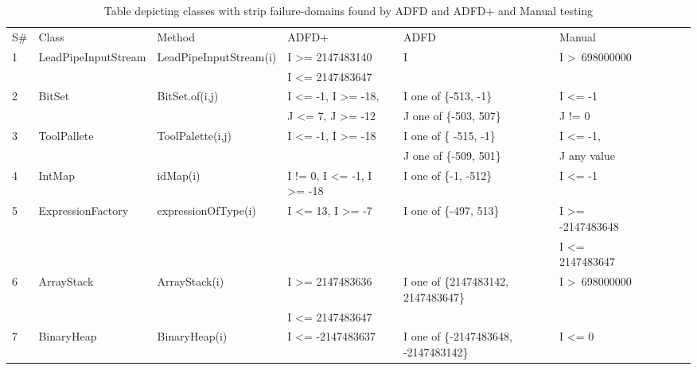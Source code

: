 \documentclass[conference]{IEEEtran}
\begin{document}
\begin{table}[h]
\caption{Table depicting classes with strip failure-domains found by ADFD and ADFD+ and Manual testing}
\centering
{\renewcommand{\arraystretch}{0.9}
\begin{tabular}{llllllllll}

S\#  & Class						& Method 					& ADFD+       								& ADFD     								& Manual							\\
1	&LeadPipeInputStream 		& LeadPipeInputStream(i)		& I \textgreater= 2147483140				& I 										& I \textgreater~698000000			\\ 
	&                                             &                                             & I \textless= 2147483647  					&										&									\\
2	& BitSet				  		& BitSet.of(i,j)				& I \textless= -1, I \textgreater= -18,			& I one of \{-513, -1\}					& I \textless= -1						\\ 
	&                                             &                                             & J \textless= 7, J \textgreater= -12  			& J one of \{-503, 507\}					& J != 0								\\
3	& ToolPallete			  		& ToolPalette(i,j)				& I \textless= -1, I \textgreater= -18			& I one of \{ -515, -1\}					& I \textless= -1, 					\\ 
	&                                             &                                             & 				  							& J one of \{-509, 501\}					& J any value			   				\\
4	& IntMap			  		& idMap(i)					& I != 0, I \textless= -1, I \textgreater= -18	& I one of \{-1, -512\} 					& I \textless= -1						\\ 
5	& ExpressionFactory	  		& expressionOfType(i)		& I \textless= 13, I \textgreater= -7			& I one of \{-497, 513\}					& I \textgreater= -2147483648 		\\ 
	&                                             & 				  			& 											&										& I \textless= 2147483647			\\
6	& ArrayStack					& ArrayStack(i)				& I \textgreater= 2147483636				& I one of \{2147483142, 2147483647\}	& I \textgreater~698000000 			\\ 
	&                                             &                                             & I \textless= 2147483647 					& 										&  			   						\\
7	& BinaryHeap				& BinaryHeap(i)				& I \textless= -2147483637					& I one of \{-2147483648, -2147483142\}	& I \textless= 0						 \\

\end{tabular}}
\end{table}
\end{document}
